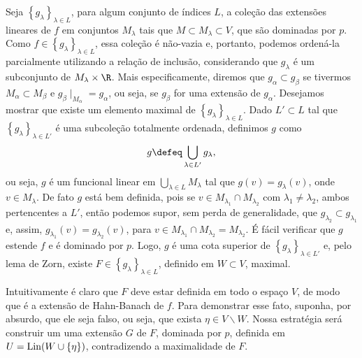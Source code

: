Seja \( \left\{ g_{ \lambda } \right\}_{ \lambda \in L } \), para algum conjunto de índices \( L \), a coleção das extensões lineares de \( f \) em conjuntos \( M_{ \lambda } \) tais que \( M \subset  M_{ \lambda } \subset V \), que são dominadas por \( p \).
Como \( f \in \left\{ g_{ \lambda } \right\}_{ \lambda \in L } \), essa coleção é não-vazia e, portanto, podemos ordená-la parcialmente utilizando a relação de inclusão, considerando que \( g_{ \lambda } \) é um subconjunto de \( M_{ \lambda } \times \R \).
Mais especificamente, diremos que \( g_{ \alpha } \subset g_{ \beta } \) se tivermos \( M_{ \alpha } \subset M_{ \beta } \) e \( g_{ \beta } \mid_{ M_{ \alpha } } = g_{ \alpha } \), ou seja, se \( g_{ \beta } \) for uma extensão de \( g_{ \alpha } \).
Desejamos mostrar que existe um elemento maximal de \( \left\{ g_{ \lambda } \right\}_{ \lambda \in L } \).
Dado \( L' \subset L \) tal que \( \left\{ g_{ \lambda } \right\}_{ \lambda \in L' } \) é uma subcoleção totalmente ordenada, definimos \( g \) como
\begin{equation}
    g \defeq \bigcup_{ \lambda \in L' } g_{ \lambda }
,\end{equation}
ou seja, \( g \) é um funcional linear em \( \bigcup_{ \lambda \in L } M_{ \lambda } \) tal que \( g(v) = g_{ \lambda } (v) \), onde \( v \in M_{ \lambda } \).
De fato \( g \) está bem definida, pois se \( v \in M_{ \lambda_{ 1 } } \cap M_{ \lambda_{ 2 } } \) com \( \lambda_{ 1 } \neq \lambda_{ 2 } \), ambos pertencentes a \( L' \), então podemos supor, sem perda de generalidade, que \( g_{ \lambda_{ 2 } } \subset g_{ \lambda_{ 1 } } \) e, assim, \( g_{ \lambda_{ 1 } } (v) = g_{ \lambda_{ 2 } }(v) \), para \( v \in M_{ \lambda_{ 1 } } \cap M_{ \lambda_{ 2 } } = M_{ \lambda_{ 2 } } \). 
É fácil verificar que \( g \) estende \( f \) e é dominado por \( p \).
Logo, \( g \) é uma cota superior de \( \left\{ g_{ \lambda } \right\}_{ \lambda \in L' } \) e, pelo lema de Zorn, existe \( F \in \left\{ g_{ \lambda } \right\}_{ \lambda \in L } \), definido em \( W \subset  V \), maximal.

Intuitivamente é claro que \( F \) deve estar definida em todo o espaço \( V \), de modo que é a extensão de Hahn-Banach de \( f \).
Para demonstrar esse fato, suponha, por absurdo, que ele seja falso, ou seja, que exista \( \eta \in V \backslash W \).
Nossa estratégia será construir um uma extensão \( G \) de \( F \), dominada por \( p \), definida em \( U = \operatorname{Lin} (W \cup \left\{ \eta \right\}) \), contradizendo a maximalidade de \( F \).

